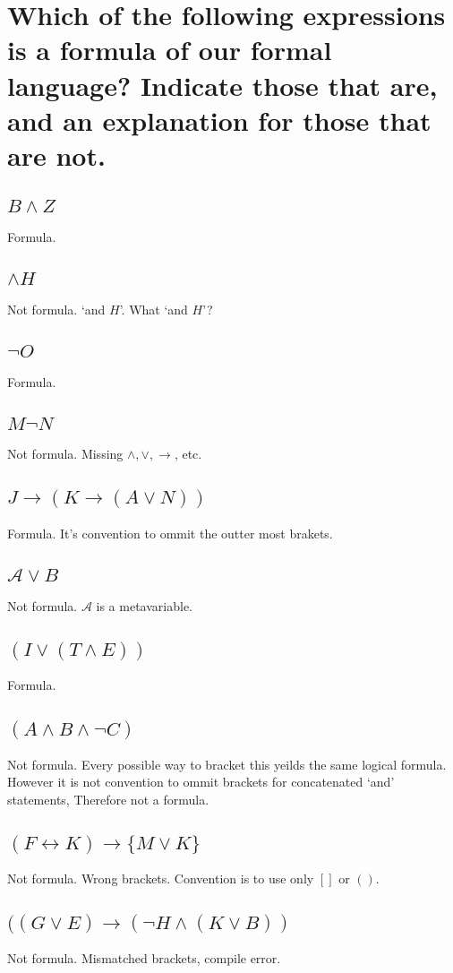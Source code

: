 \documentclass[10pt, letterpaper, titlepage]{article}
\newcommand{\A}{\mathscr{A}}
\newcommand{\lra}{\leftrightarrow}
\begin{document}
    \section{Which of the following expressions is a formula of our formal language? Indicate those
        that are, and an explanation for those that are not.}
        \begin{multicols}{2}
            \subsection{$B \land Z$}
                Formula.
            \subsection{$\land H$}
                Not formula. `and $H$'. What `and $H$'?
            \subsection{$\lnot O$}
                Formula.
            \subsection{$M \lnot N$}
                Not formula. Missing $\land, \lor, \to$, etc.
            \subsection{$J \to  (K \to  (A \lor  N ))$}
                Formula. It's convention to ommit the outter most brakets.
            \subsection{$\A \lor  B$}
                Not formula. $\A$ is a metavariable.
            \subsection{$(I \lor  (T \land  E))$}
                Formula.
            \subsection{$(A \land  B \land  \lnot C)$}
                Not formula.
                Every possible way to bracket this yeilds the same logical formula.
                However it is not convention to ommit brackets for concatenated `and' statements, 
                Therefore not a formula.
            \subsection{$(F \lra  K) \to  \{ M \lor  K \}$}
                Not formula.
                Wrong brackets. Convention is to use only $[]$ or $()$.
            \subsection{$((G \lor  E) \to  (\lnot H \land  (K \lor  B))$}
                Not formula. Mismatched brackets, compile error.
        \end{multicols}
\end{document}
